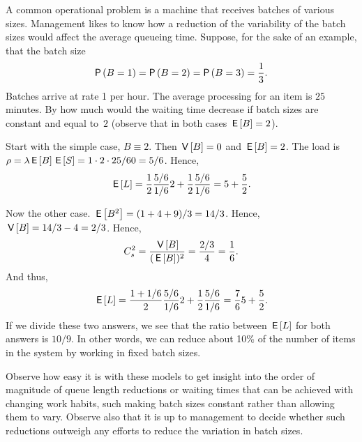 \begin{exercise}
  A common operational problem is a machine that receives batches of
  various sizes. Management likes to know how a reduction of the
  variability of the batch sizes would affect the average queueing time.
  Suppose, for the sake of an example, that the batch size 
  \begin{equation*}
    \P{B=1} = \P{B=2} = \P{B=3} = \frac 13.
  \end{equation*}
  Batches arrive at rate 1 per hour. The average processing for an
  item is $25$ minutes.  By how much would the waiting time decrease if
  batch sizes are constant and equal to~$2$ (observe that in both cases $\,\mathsf{E}\left[B\right] =2$).
  \begin{solution}
    Start with the simple case, $B\equiv 2$. Then $\,\mathsf{V}\left[B\right]=0$ and
    $\,\mathsf{E}\left[B\right] = 2$. The load is $\rho=\lambda \,\mathsf{E}\left[B\right] \,\mathsf{E}\left[S\right] = 1\cdot 2 \cdot 25/60 = 5/6$.  Hence,
    \begin{equation*}
      \,\mathsf{E}\left[L\right] = \frac 12 \frac{5/6}{1/6} 2 + \frac 12 \frac{5/6}{1/6} = 5 + \frac52.
    \end{equation*}

Now the other case. $\,\mathsf{E}\left[B^2\right] = (1+4+9)/3 = 14/3$. Hence, $\,\mathsf{V}\left[B\right]=14/3 - 4=2/3$. Hence, 
\begin{equation*}
C_s^2=\frac{\,\mathsf{V}\left[B\right]}{(\,\mathsf{E}\left[B\right])^2} = \frac{2/3}4 = \frac 16.
\end{equation*}
And thus, 
    \begin{equation*}
      \,\mathsf{E}\left[L\right] = \frac {1+1/6}2 \frac{5/6}{1/6} 2 + \frac 12 \frac{5/6}{1/6} = \frac76 5 + \frac 52.
    \end{equation*}
    If we divide these two answers, we see that the ratio between
    $\,\mathsf{E}\left[L\right]$ for both answers is $10/9$. In other words, we can
    reduce about 10\% of the number of items in the system by working
    in fixed batch sizes. 
  \end{solution}
\end{exercise}

Observe how easy it is with these models to get insight into the order
of magnitude of queue length reductions or waiting times that can be
achieved with changing work habits, such making batch sizes constant
rather than allowing them to vary. Observe also that it is up to
management to decide whether such reductions outweigh any efforts to
reduce the variation in batch sizes. 


